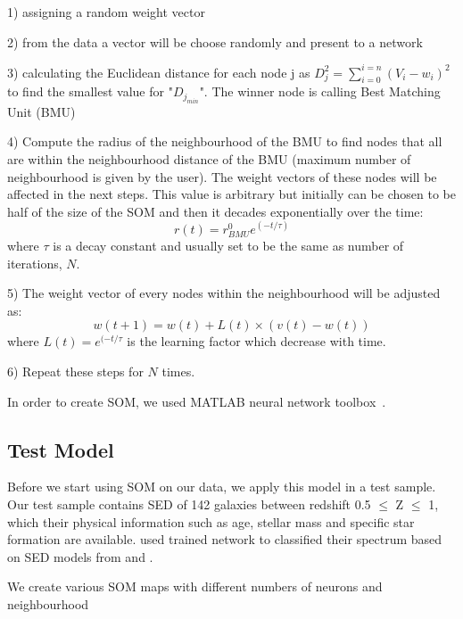   1) assigning a random weight vector
  
  2) from the data a vector will be choose randomly and present to a network
  
  3) calculating the Euclidean distance for each node j as  $D_j^2= \sum_{i=0}^{i=n} (V_i - w_i)^2 $ to find the smallest value for "$D_{j_{min}}$". The winner node is calling Best Matching Unit (BMU)
  
  4) Compute the radius of the neighbourhood of the BMU to find nodes that all are within the neighbourhood distance of the BMU (maximum number of neighbourhood is given by the user). The weight vectors of these nodes will be affected in the next steps. This value is arbitrary but initially can be chosen to be half of the size of the SOM and then it decades exponentially over the time:
   \begin{equation}
   r(t) = r^0_{BMU}e^{(-t/\tau)}
   \end{equation}
   where $\tau$ is a decay constant and usually set to be the same as number of iterations, $N$.
   
   5) The weight vector of every nodes within the neighbourhood will be adjusted as:
   \begin{equation}
   w(t+1)=w(t)+L(t) \times(v(t)-w(t))
   \end{equation}
   where $L(t) = e^{(-t/\tau}$ is the learning factor which decrease with time.
   
   6) Repeat these steps for $N$ times.
   
      
In order to create SOM, we used {\tiny MATLAB} neural network toolbox~\citep{sommatlab}.
   
 \subsection{Test Model}
 Before we start using SOM on our data, we apply this model in a test sample. 
 Our test sample contains SED of 142 galaxies between redshift 0.5 $ \leq$ Z $\leq $ 1, which their physical information such as age, stellar mass and specific star formation are available. 
 \cite{Hossein12} used trained network to classified their spectrum based on SED models from \cite{Kinney96} and \cite{Coleman80}.
 
 
 We create various SOM maps with different numbers of neurons and neighbourhood 
